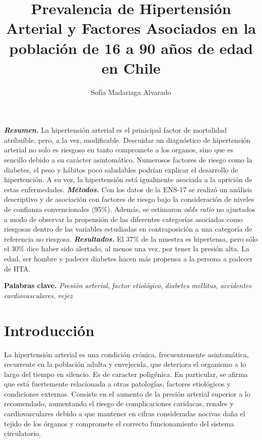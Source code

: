 \documentclass{aa}
\begin{document}
\title{Prevalencia de Hipertensión Arterial y Factores Asociados  en la población de 16 a 90 años de edad en Chile}
\author{Sofía Madariaga Alvarado}

\abstract
{\textbf{\textit{Resumen.}} La hipertensión arterial es el prinicipal factor de mortalidad atribuíble, pero, a la vez, modificable. Descuidar un diagnóstico de hipertensión arterial no solo es riesgoso en tanto compromete a los organos, sino que es sencillo debido a su carácter asintomático. Numerosos factores de riesgo como la diabetes, el peso y hábitos poco saludables podrían explicar el desarrollo de hipertención. A su vez, la hipertensión está igualmente asociada a la aprición de estas enfermedades. \textbf{\textit{Métodos.}} Con los datos de la ENS-17 se realizó un análisis descriptivo y de asociación con factores de riesgo bajo la consideración de niveles de confianza convencionales (95\%). Además, se estimaron \textit{odds ratio} no ajustados a modo de observar la propensión de las diferentes categorías asociadas como riesgosas dentro de las variables estudiadas en contraposición a una categoría de referencia no riesgosa. \textbf{\textit{Resultados.}} El 37\% de la muestra es hipertensa, pero sólo el 30\% dice haber sido alertado, al menos una vez, por tener la presión alta. La edad, ser hombre y padecer diabetes hacen más propensa a la persona a padecer de HTA.
\tiny

\textbf{Palabras clave.} \textit{Presión arterial}, \textit{factor etiológico}, \textit{diabetes mellitus}, \textit{accidentes cardiovasculares}, \textit{vejez}
}

\maketitle

\section{Introducción}

La hipertensión arterial es una condición crónica, frecuentemente asintomática, recurrente en la población adulta y envejecida, que deteriora el organismo a lo largo del tiempo en silencio. Es de caracter poligénica. En particular, se afirma que está fuertemente relacionada a otras patologías, factores etiológicos y condiciones externas. Consiste en el aumento de la presión arterial superior a lo recomendado, aumentando el riesgo de complicaciones caridacas, renales y cardiovasculares debido a que mantener en cifras consideradas nocivas daña el tejido de los órganos y compromete el correcto funcionamiento del sistema circulatorio.
\end{document}
